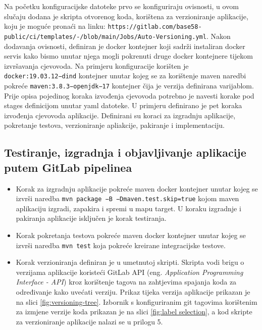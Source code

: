\documentclass[a4paper,12pt,oneside]{article}
\begin{document}
Na početku konfiguracijske datoteke prvo se konfiguriraju ovisnosti, u ovom slučaju dodana je skripta otvorenog koda, korištena za verzioniranje aplikacije, koju je moguće pronaći na linku: \texttt{https://gitlab.com/base58-public/\-ci/\-templates/-/blob/\-main/\-Jobs/\-Auto-Versioning.yml}. Nakon dodavanja ovisnosti, definiran je docker kontejner koji sadrži instaliran docker servis kako bismo unutar njega mogli pokrenuti druge docker kontejnere tijekom izvršavanja cjevovoda. Na primjeru konfiguracije korišten je \texttt{docker:19.03.12−dind} kontejner unutar kojeg se za korištenje maven naredbi pokreće \texttt{maven:3.8.3−openjdk−17} kontejner čija je verzija definirana varijablom. Prije opisa pojedinog koraka izvođenja cjevovoda potrebno je navesti korake pod stages definicijom unutar yaml datoteke. U primjeru definirano je pet koraka izvođenja cjevovoda aplikacije. Definirani su koraci za izgradnju aplikacije, pokretanje testova, verzioniranje apliakcije, pakiranje i implementaciju. 


\subsection{Testiranje, izgradnja i objavljivanje aplikacije putem GitLab pipelinea}

\begin{itemize}

\item Korak za izgradnju aplikacije pokreće maven docker kontejner unutar kojeg se izvrši naredba \texttt{mvn package −B −Dmaven.test.skip=true} kojom maven aplikaciju izgradi, zapakira i spremi u mapu target. U koraku izgradnje i pakiranja aplikacije isključen je korak testiranja.

\item Korak pokretanja testova pokreće maven docker kontejner unutar kojeg se izvrši naredba \texttt{mvn test} koja pokreće kreirane integracijske testove.

\item Korak verzioniranja definiran je u umetnutoj skripti. Skripta vodi brigu o verzijama aplikacije koristeći GitLab API (eng. \textit{Application Programming Interface - API}) kroz korištenje tagova na zahtjevima spajanja koda za određivanje kako uvećati verziju. Prikaz tijeka verzija aplikacije prikazan je na slici \ref{fig:versioning-tree}. Izbornik s konfiguriranim git tagovima korištenim za izmjene verzije koda prikazan je na slici \ref{fig:label selection}, a kod skripte za verzioniranje aplikacije nalazi se u prilogu 5.
\end{itemize}
\end{document}
